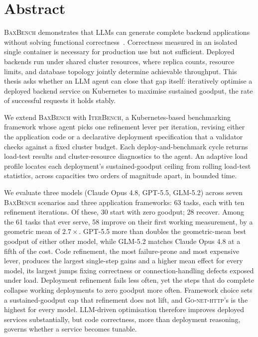 \chapter*{Abstract}

\textsc{BaxBench} demonstrates that LLMs can generate complete backend
applications without solving functional
correctness~\cite{vero2025baxbench}. Correctness measured in an isolated single
container is necessary for production use but not sufficient. Deployed backends
run under shared cluster resources, where replica counts, resource limits, and
database topology jointly determine achievable throughput. This thesis asks
whether an LLM agent can close that gap itself: iteratively optimise a deployed
backend service on Kubernetes to maximise sustained goodput, the rate of
successful requests it holds stably.

We extend \textsc{BaxBench} with \textsc{IterBench}, a Kubernetes-based
benchmarking framework whose agent picks one refinement lever per iteration,
revising either the application code or a declarative deployment specification
that a validator checks against a fixed cluster budget. Each
deploy-and-benchmark cycle returns load-test results and cluster-resource
diagnostics to the agent. An adaptive load profile locates each deployment's
sustained-goodput ceiling from rolling load-test statistics, across capacities
two orders of magnitude apart, in bounded time.

We evaluate three models (Claude Opus 4.8, GPT-5.5, GLM-5.2) across seven
\textsc{BaxBench} scenarios and three application frameworks: 63 tasks, each
with ten refinement iterations. Of these, 30 start with zero goodput; 28
recover. Among the 61 tasks that ever serve, 58 improve on their first working
measurement, by a geometric mean of $2.7\times$. GPT-5.5 more than doubles the
geometric-mean best goodput of either other model, while GLM-5.2 matches Claude
Opus 4.8 at a fifth of the cost. Code refinement, the most failure-prone and
most expensive lever, produces the largest single-step gains and a higher mean
effect for every model, its largest jumps fixing correctness or
connection-handling defects exposed under load. Deployment refinement fails
less often, yet the steps that do complete collapse working deployments to zero
goodput more often. Framework choice sets a sustained-goodput cap that
refinement does not lift, and \textsc{Go-net-http}'s is the highest for every
model. LLM-driven optimisation therefore improves deployed services
substantially, but code correctness, more than deployment reasoning, governs
whether a service becomes tunable.
